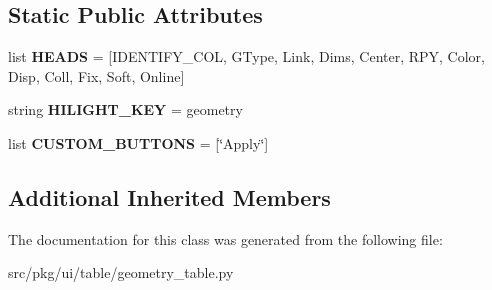 \subsection*{Static Public Attributes}
\begin{DoxyCompactItemize}
\item 
\mbox{\label{classrnb-planning_1_1src_1_1pkg_1_1ui_1_1table_1_1geometry__table_1_1_geometry_table_a59558c5d720567b79d185a7fb0af1a4f}} 
list {\bfseries H\+E\+A\+DS} = \mbox{[}I\+D\+E\+N\+T\+I\+F\+Y\+\_\+\+C\+OL, \textquotesingle{}G\+Type\textquotesingle{}, \textquotesingle{}Link\textquotesingle{}, \textquotesingle{}Dims\textquotesingle{}, \textquotesingle{}Center\textquotesingle{}, \textquotesingle{}R\+PY\textquotesingle{}, \textquotesingle{}Color\textquotesingle{}, \textquotesingle{}Disp\textquotesingle{}, \textquotesingle{}Coll\textquotesingle{}, \textquotesingle{}Fix\textquotesingle{}, \textquotesingle{}Soft\textquotesingle{}, \textquotesingle{}Online\textquotesingle{}\mbox{]}
\item 
\mbox{\label{classrnb-planning_1_1src_1_1pkg_1_1ui_1_1table_1_1geometry__table_1_1_geometry_table_a28aae67c0a68c24d2e00d17fe2151b19}} 
string {\bfseries H\+I\+L\+I\+G\+H\+T\+\_\+\+K\+EY} = \textquotesingle{}geometry\textquotesingle{}
\item 
\mbox{\label{classrnb-planning_1_1src_1_1pkg_1_1ui_1_1table_1_1geometry__table_1_1_geometry_table_a6d7b5b5092974043eacfaa3c3b308f83}} 
list {\bfseries C\+U\+S\+T\+O\+M\+\_\+\+B\+U\+T\+T\+O\+NS} = \mbox{[}\char`\"{}Apply\char`\"{}\mbox{]}
\end{DoxyCompactItemize}
\subsection*{Additional Inherited Members}


The documentation for this class was generated from the following file\+:\begin{DoxyCompactItemize}
\item 
src/pkg/ui/table/geometry\+\_\+table.\+py\end{DoxyCompactItemize}
